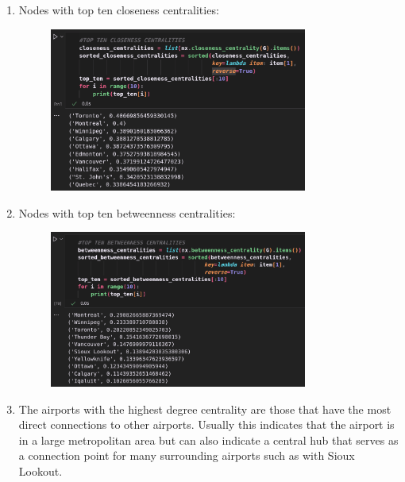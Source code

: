 \documentclass{article}
\begin{document}
\begin{enumerate}[label=(\alph*), left=10pt, itemsep=10pt]
        \item \begin{minipage}[t]{0.9\textwidth}
            Nodes with top ten closeness centralities:
            \begin{figure}[H]
                \centering
                \includegraphics[width=0.8\textwidth, height=0.3\textheight]{./1c.png}
            \end{figure}
        \end{minipage}

        \item \begin{minipage}[t]{0.9\textwidth}
            Nodes with top ten betweenness centralities:
            \begin{figure}[H]
                \centering
                \includegraphics[width=0.8\textwidth, height=0.3\textheight]{./1d.png}
            \end{figure}
        \end{minipage}

        \item \begin{minipage}[t]{0.9\textwidth}
            The airports with the highest degree centrality are those that have the most direct
            connections to other airports. Usually this indicates that the airport is in a large
            metropolitan area but can also indicate a central hub that serves as a connection
            point for many surrounding airports such as with Sioux Lookout.\\


\end{minipage}
\end{enumerate}
\end{document}
